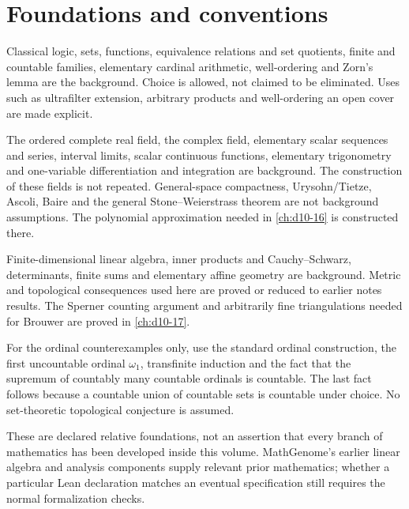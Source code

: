 \documentclass[11pt,oneside,openany]{book}
\theoremstyle{definition}
\theoremstyle{remark}
\newcounter{foundation}
\begin{document}
\chapter*{Foundations and conventions}
\begin{description}[style=nextline,leftmargin=12mm]
\item[F1: sets and choice]\label{base:sets}
Classical logic, sets, functions, equivalence relations and set quotients,
finite and countable families, elementary cardinal arithmetic, well-ordering
and Zorn's lemma are the background. Choice is allowed, not claimed to be
eliminated. Uses such as ultrafilter extension, arbitrary products and
well-ordering an open cover are made explicit.
\item[F2: scalar mathematics]\label{base:real}
The ordered complete real field, the complex field, elementary scalar
sequences and series, interval limits, scalar continuous functions, elementary
trigonometry and one-variable differentiation and integration are background.
The construction of these fields is not repeated. General-space compactness,
Urysohn/Tietze, Ascoli, Baire and the general Stone--Weierstrass theorem are
not background assumptions. The polynomial approximation needed in
\cref{ch:d10-16} is constructed there.
\item[F3: finite algebra and Euclidean calculations]\label{base:linear}
Finite-dimensional linear algebra, inner products and Cauchy--Schwarz,
determinants, finite sums and elementary affine geometry are background.
Metric and topological consequences used here are proved or reduced to earlier
notes results. The Sperner counting argument and arbitrarily fine
triangulations needed for Brouwer are proved in \cref{ch:d10-17}.
\item[F4: ordinals in selected examples]\label{base:ordinals}
For the ordinal counterexamples only, use the standard ordinal construction,
the first uncountable ordinal $\omega_1$, transfinite induction and the fact
that the supremum of countably many countable ordinals is countable. The last
fact follows because a countable union of countable sets is countable under
choice. No set-theoretic topological conjecture is assumed.
\end{description}

These are declared relative foundations, not an assertion that every branch
of mathematics has been developed inside this volume. MathGenome's earlier
linear algebra and analysis components supply relevant prior mathematics;
whether a particular Lean declaration matches an eventual specification still
requires the normal formalization checks.
\end{document}
